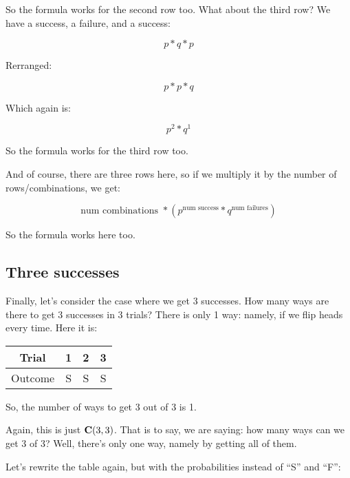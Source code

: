 \documentclass[../../../main.tex]{subfiles}
\begin{document}
So the formula works for the second row too. What about the third row? We have a success, a failure, and a success:

\begin{equation*}
    p * q * p
\end{equation*}

Rerranged:

\begin{equation*}
    p * p * q
\end{equation*}

Which again is:

\begin{equation*}
    p^{2} * q^{1}
\end{equation*}

So the formula works for the third row too.

And of course, there are three rows here, so if we multiply it by the number of rows/combinations, we get:

\begin{equation*}
    \text{num combinations } * (p^{\text{num success}} * q^{\text{num failures}})
\end{equation*}

So the formula works here too.


\subsection{Three successes}

Finally, let's consider the case where we get 3 successes. How many ways are there to get 3 successes in 3 trials? There is only 1 way: namely, if we flip heads every time. Here it is:

\begin{center}
  \begin{tabular}{| c | c | c | c |}
    \hline
      \textbf{Trial} & \textbf{1} & \textbf{2} & \textbf{3} \\ \hline
  Outcome & S & S & S \\ \hline
  \end{tabular}
\end{center}

\noindent
So, the number of ways to get 3 out of 3 is 1.

Again, this is just $\mathbf{C}(3, 3)$. That is to say, we are saying: how many ways can we get 3 of 3? Well, there's only one way, namely by getting all of them.

Let's rewrite the table again, but with the probabilities instead of ``S'' and ``F'':
\end{document}
